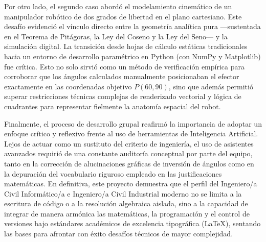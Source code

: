 \documentclass[12pt]{article}
\begin{document}
Por otro lado, el segundo caso abordó el modelamiento cinemático de un manipulador robótico de dos grados de libertad en el plano cartesiano. Este desafío evidenció el vínculo directo entre la geometría analítica pura —sustentada en el Teorema de Pitágoras, la Ley del Coseno y la Ley del Seno— y la simulación digital. La transición desde hojas de cálculo estáticas tradicionales hacia un entorno de desarrollo paramétrico en Python (con NumPy y Matplotlib) fue crítica. Esto no solo sirvió como un método de verificación empírica para corroborar que los ángulos calculados manualmente posicionaban el efector exactamente en las coordenadas objetivo $P(60, 90)$, sino que además permitió superar restricciones técnicas complejas de renderizado vectorial y lógica de cuadrantes para representar fielmente la anatomía espacial del robot.

\newpage

Finalmente, el proceso de desarrollo grupal reafirmó la importancia de adoptar un enfoque crítico y reflexivo frente al uso de herramientas de Inteligencia Artificial. Lejos de actuar como un sustituto del criterio de ingeniería, el uso de asistentes avanzados requirió de una constante auditoría conceptual por parte del equipo, tanto en la corrección de alucinaciones gráficas de inversión de ángulos como en la depuración del vocabulario riguroso empleado en las justificaciones matemáticas. En definitiva, este proyecto demuestra que el perfil del Ingeniero/a Civil Informático/a e Ingeniero/a Civil Industrial moderno no se limita a la escritura de código o a la resolución algebraica aislada, sino a la capacidad de integrar de manera armónica las matemáticas, la programación y el control de versiones bajo estándares académicos de excelencia tipográfica (LaTeX), sentando las bases para afrontar con éxito desafíos técnicos de mayor complejidad.
\end{document}

